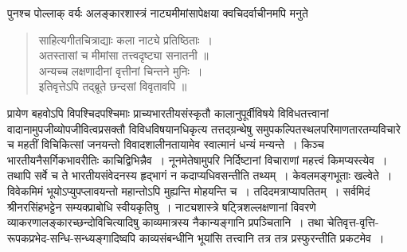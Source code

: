 {\dev पुनश्च पोल्लाक् वर्यः अलङ्कारशास्त्रं नाट्यमीमांसापेक्षया क्वचिदर्वाचीनमपि मनुते}
\begin{quote}
{\dev साहित्यगीतचित्राद्याः कला नाट्ये प्रतिष्ठिताः~।}\\
{\dev अतस्तासां च मीमांसा तत्त्वदृष्ट्या सनातनी ॥}\\[5pt]
{\dev अन्यच्च लक्षणादीनां वृत्तीनां चिन्तने मुनिः~।}\\
{\dev इतिवृत्तेऽपि तद्ब्रूते छन्दसां विवृतावपि ॥}
\end{quote}

{\dev प्रायेण बहवोऽपि विपश्चिदपश्चिमाः प्राच्यभारतीयसंस्कृतौ कालानुपूर्वीविषये विविधतत्त्वानां वादानामुपजीव्योपजीवित्वप्रसक्तौ विविधविषयानधिकृत्य तत्तद्ग्रन्थेषु समुपकल्पितस्थलपरि\-माणतारतम्यविचारे च महतीं विचिकित्सां जनयन्तो विवादशालीनतायामेव स्वात्मानं धन्यं मन्यन्ते~। किञ्च भारतीयनैसर्गिकभावरीतिः काचिद्विभिन्नैव~। नूनमेतेषामुपरि निर्दिष्टानां विचा\-राणां महत्त्वं किमप्यस्त्येव~। तथापि सर्वे च ते भारतीयसंवेदनस्य हृद्भागं न कदाप्यधिवसन्तीति तथ्यम्~। केवलमङ्गभूताः खल्वेते~। विवेकमिमं भूयोऽप्युपप्लावयन्तो महान्तोऽपि मुह्यन्ति मोहयन्ति च~। तदिदमत्राप्यापतितम्~। सर्वमिदं श्रीनरसिंहभट्टेन सम्यक्प्राबोधि स्वीयकृतिषु~। नाट्यशास्त्रे षट्त्रिशल्लक्षणानां विवरणे व्याकरणालङ्कारच्छन्दोविचित्यादिषु काव्यमात्रस्य नैका\-न्यङ्गानि प्रपञ्चितानि~। तथा चेतिवृत्त-वृत्ति-रूपकप्रभेद-सन्धि-सन्ध्यङ्गादिष्वपि काव्यसंबन्धीनि भूयांसि तत्त्वानि तत्र तत्र प्रस्फुरन्तीति प्रकटमेव~।} 


